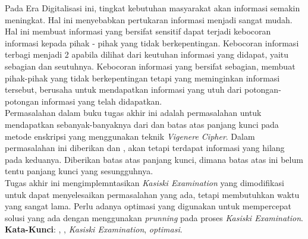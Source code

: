 \begin{abstrak}
		\indent Pada Era Digitalisasi ini, tingkat kebutuhan masyarakat akan informasi semakin meningkat. Hal ini menyebabkan pertukaran informasi menjadi sangat mudah. Hal ini membuat informasi yang bersifat sensitif dapat terjadi kebocoran informasi kepada pihak - pihak yang tidak berkepentingan. Kebocoran informasi terbagi menjadi 2 apabila dilihat dari keutuhan informasi yang didapat, yaitu sebagian dan seutuhnya. Kebocoran informasi yang bersifat sebagian, membuat pihak-pihak yang tidak berkepentingan tetapi yang meminginkan informasi tersebut, berusaha untuk mendapatkan informasi yang utuh dari potongan-potongan informasi yang telah didapatkan. 
\\
\indent Permasalahan dalam buku tugas akhir ini adalah permasalahan untuk mendapatkan \plaintext sebanyak-banyaknya dari \ciphertext dan batas atas panjang kunci pada metode enskripsi yang menggunakan teknik \textit{Vigenere Cipher}. Dalam permasalahan ini diberikan \plaintext dan \ciphertext, akan tetapi terdapat informasi yang hilang pada keduanya. Diberikan batas atas panjang kunci, dimana batas atas ini belum tentu panjang kunci yang sesungguhnya.
\\  
\indent Tugas akhir ini mengimplemntasikan \textit{Kasiski Examination} yang dimodifikasi untuk dapat menyelesaikan permasalahan yang ada, tetapi membutuhkan waktu yang sangat lama. Perlu adanya optimasi yang digunakan untuk mempercepat solusi yang ada dengan menggunakan \textit{prunning} pada proses \textit{Kasiski Examination}.
\\
\noindent \textbf{Kata-Kunci}: \plaintext, \ciphertext, \textit{Kasiski Examination}, \textit{optimasi}.
\end{abstrak}


